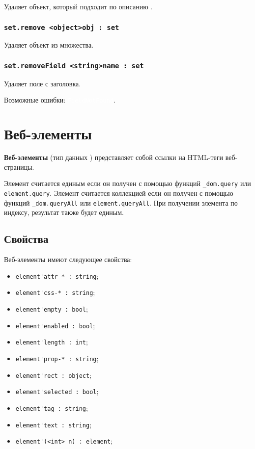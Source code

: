 \documentclass[a4paper, 14pt]{extarticle}
\newcommand{\ferror}[1]{{\fontsize{11pt}{12pt} \tt \colorbox{function}{\textcolor{white}{#1}}}}
\newenvironment{icItems}
	{ \begin{itemize} [noitemsep,nolistsep] }
	{ \end{itemize} }
\begin{document}
Удаляет объект, который подходит по описанию .

\subsubsection{\lstinline|set.remove <object>obj : set|}

Удаляет объект  из множества.

\subsubsection{\lstinline|set.removeField <string>name : set|}

Удаляет поле  с заголовка.

Возможные ошибки: \ferror{FieldNotFound}.

\newpage
\section{Веб-элементы}
\label{webelments}

{\bf Веб-элементы} (тип данных \element) представляет собой ссылки на HTML-теги веб-страницы.

Элемент считается единым если он получен с помощью функций \lstinline|_dom.query| или \lstinline|element.query|. Элемент считается коллекцией если он получен с помощью функций \lstinline|_dom.queryAll| или \lstinline|element.queryAll|. При получении элемента по индексу, результат также будет единым.

\subsection{Свойства}

Веб-элементы имеют следующее свойства:
\begin{icItems}
\item \lstinline|element'attr-* : string|;
\item \lstinline|element'css-* : string|;
\item \lstinline|element'empty : bool|;
\item \lstinline|element'enabled : bool|;
\item \lstinline|element'length : int|;
\item \lstinline|element'prop-* : string|;
\item \lstinline|element'rect : object|;
\item \lstinline|element'selected : bool|;
\item \lstinline|element'tag : string|;
\item \lstinline|element'text : string|;
\item \lstinline|element'(<int> n) : element|;
\end{icItems} 
\end{document}
